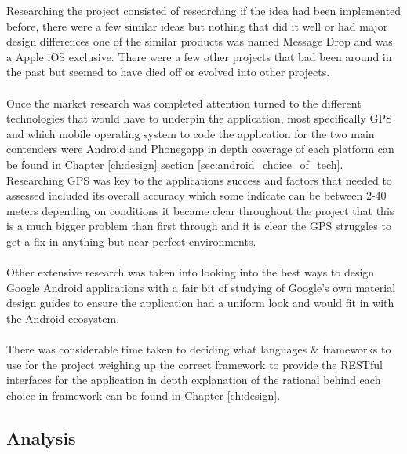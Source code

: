 Researching the project consisted of researching if the idea had been implemented before, there were a few similar ideas but nothing that did it well or had major design differences one of the similar products was named Message Drop \cite{dmt:dropmessageteam:2015:online} and was a Apple iOS exclusive. There were a few other projects that bad been around in the past but seemed to have died off or evolved into other projects.\\
\\
Once the market research was completed attention turned to the different technologies that would have to underpin the application, most specifically GPS and which mobile operating system to code the application for the two main contenders were Android and Phonegapp in depth coverage of each platform can be found in Chapter \ref{ch:design} section \ref{sec:android_choice_of_tech}. Researching GPS was key to the applications success and factors that needed to assessed included its overall accuracy which some indicate can be between 2-40 meters \cite{DevdattaTengshe:gpsacuracy:2012:online} depending on conditions it became clear throughout the project that this is a much bigger problem than first through and it is clear the GPS struggles to get a fix in anything but near perfect environments.\\
\\
Other extensive research was taken into looking into the best ways to design Google Android applications with a fair bit of studying of Google's own material design guides to ensure the application had a uniform look and would fit in with the Android ecosystem.\\
\\
There was considerable time taken to deciding what languages \& frameworks to use for the project weighing up the correct framework to provide the RESTful interfaces for the application in depth explanation of the rational behind each choice in framework can be found in Chapter \ref{ch:design}.

\subsection{Analysis}

